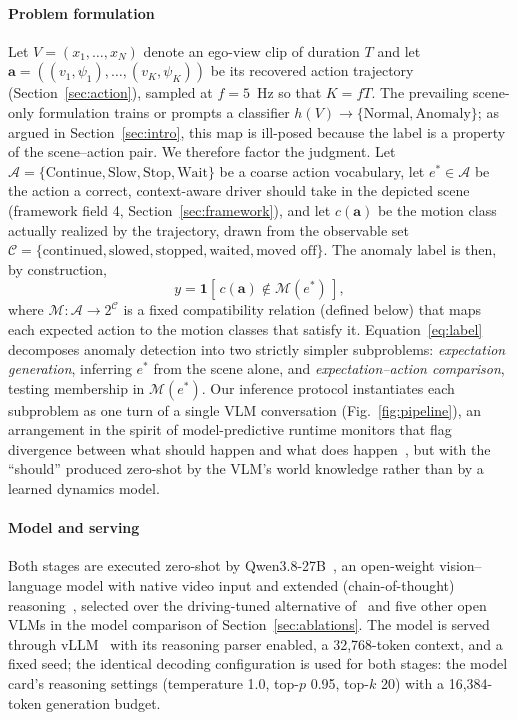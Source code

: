 \documentclass[conference]{IEEEtran}
\newcommand{\act}{\boldsymbol{a}}          %
\newcommand{\ind}{\mathbf{1}}              %
\newcommand{\Acal}{\mathcal{A}}            %
\newcommand{\Mcal}{\mathcal{M}}            %
\newcommand{\Ccal}{\mathcal{C}}            %
\begin{document}
\paragraph{Problem formulation} Let $V = (x_1, \dots, x_N)$ denote an ego-view clip of duration $T$ and let $\act = ((v_1, \psi_1), \dots, (v_K, \psi_K))$ be its recovered action trajectory (Section~\ref{sec:action}), sampled at $f = 5$~Hz so that $K = fT$. The prevailing scene-only formulation trains or prompts a classifier $h(V) \rightarrow \{\text{Normal}, \text{Anomaly}\}$; as argued in Section~\ref{sec:intro}, this map is ill-posed because the label is a property of the scene--action pair. We therefore factor the judgment. Let $\Acal = \{\text{Continue}, \text{Slow}, \text{Stop}, \text{Wait}\}$ be a coarse action vocabulary, let $e^* \in \Acal$ be the action a correct, context-aware driver should take in the depicted scene (framework field 4, Section~\ref{sec:framework}), and let $c(\act)$ be the motion class actually realized by the trajectory, drawn from the observable set $\Ccal = \{\text{continued}, \text{slowed}, \text{stopped}, \text{waited}, \text{moved off}\}$. The anomaly label is then, by construction,
\begin{equation}
y = \ind\!\left[\, c(\act) \notin \Mcal(e^*) \,\right],\label{eq:label}
\end{equation}
where $\Mcal : \Acal \rightarrow 2^{\Ccal}$ is a fixed compatibility relation (defined below) that maps each expected action to the motion classes that satisfy it. Equation~\eqref{eq:label} decomposes anomaly detection into two strictly simpler subproblems: \emph{expectation generation}, inferring $e^*$ from the scene alone, and \emph{expectation--action comparison}, testing membership in $\Mcal(e^*)$. Our inference protocol instantiates each subproblem as one turn of a single VLM conversation (Fig.~\ref{fig:pipeline}), an arrangement in the spirit of model-predictive runtime monitors that flag divergence between what should happen and what does happen~\cite{b31}, but with the ``should'' produced zero-shot by the VLM's world knowledge rather than by a learned dynamics model.

\paragraph{Model and serving} Both stages are executed zero-shot by Qwen3.8-27B~\cite{b32}, an open-weight vision--language model with native video input and extended (chain-of-thought) reasoning~\cite{b33}, selected over the driving-tuned alternative of~\cite{b11} and five other open VLMs in the model comparison of Section~\ref{sec:ablations}. The model is served through vLLM~\cite{b34} with its reasoning parser enabled, a 32{,}768-token context, and a fixed seed; the identical decoding configuration is used for both stages: the model card's reasoning settings (temperature 1.0, top-$p$ 0.95, top-$k$ 20) with a 16{,}384-token generation budget.
\end{document}
